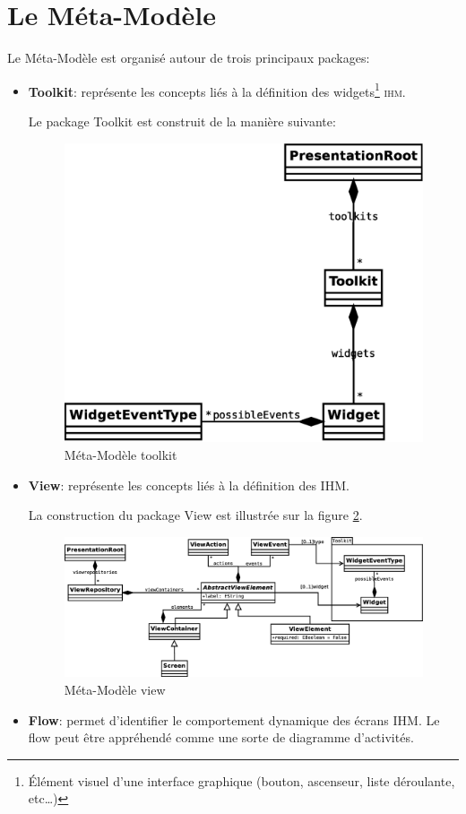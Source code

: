\section{Le Méta-Modèle \kwcinematic{}}
Le Méta-Modèle \kwcinematic{} est organisé autour de trois principaux packages:
\begin{itemize}
  \item \textbf{Toolkit}: représente les concepts liés à la définition des widgets\footnote{Élément visuel d'une interface graphique (bouton, ascenseur, liste déroulante, etc\dots)} \textsc{ihm}.

Le package Toolkit est construit de la manière suivante:

\begin{figure}[htb]
  \centering
  \includegraphics[scale=.3]{img/toolkit.eps}
  \caption{Méta-Modèle toolkit}
  \label{fig:toolkit}
\end{figure}
  \item \textbf{View}: représente les concepts liés à la définition des  \textsc{IHM}.

La construction du package View est illustrée sur la figure \ref{fig:view}.
\begin{figure}[h]
  \centering
  \includegraphics[scale=.3]{img/view.eps}
  \caption{Méta-Modèle view}
  \label{fig:view}
\end{figure}
  \item \textbf{Flow}: permet d'identifier le comportement dynamique des écrans \textsc{IHM}. Le flow peut être appréhendé comme une sorte de diagramme d'activités.


\end{itemize}
